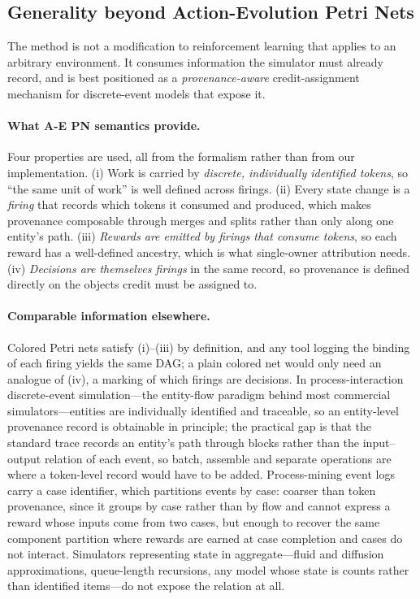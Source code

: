 \documentclass[review,authoryear,3p,times]{elsarticle}
\begin{document}
\subsection{Generality beyond Action-Evolution Petri Nets}
\label{sec:generality}

The method is not a modification to reinforcement learning that applies to an
arbitrary environment. It consumes information the simulator must already
record, and is best positioned as a \emph{provenance-aware} credit-assignment
mechanism for discrete-event models that expose it.

\paragraph{What A-E PN semantics provide.} Four properties are used, all from
the formalism rather than from our implementation. (i) Work is carried by
\emph{discrete, individually identified tokens}, so ``the same unit of work'' is
well defined across firings. (ii) Every state change is a \emph{firing} that
records which tokens it consumed and produced, which makes provenance composable
through merges and splits rather than only along one entity's path.
(iii) \emph{Rewards are emitted by firings that consume tokens}, so each reward
has a well-defined ancestry, which is what single-owner attribution needs.
(iv) \emph{Decisions are themselves firings} in the same record, so provenance
is defined directly on the objects credit must be assigned to.

\paragraph{Comparable information elsewhere.} Colored Petri nets
\citep{cpn_jensen} satisfy (i)--(iii) by definition, and any tool logging the
binding of each firing yields the same DAG; a plain colored net would only need
an analogue of (iv), a marking of which firings are decisions. In
process-interaction discrete-event simulation---the entity-flow paradigm behind
most commercial simulators---entities are individually identified and traceable,
so an entity-level provenance record is obtainable in principle; the practical
gap is that the standard trace records an entity's path through blocks rather
than the input--output relation of each event, so batch, assemble and separate
operations are where a token-level record would have to be added.
Process-mining event logs carry a case identifier, which partitions events by
case: coarser than token provenance, since it groups by case rather than by flow
and cannot express a reward whose inputs come from two cases, but enough to
recover the same component partition where rewards are earned at case completion
and cases do not interact. Simulators representing state in aggregate---fluid
and diffusion approximations, queue-length recursions, any model whose state is
counts rather than identified items---do not expose the relation at all.
\end{document}
